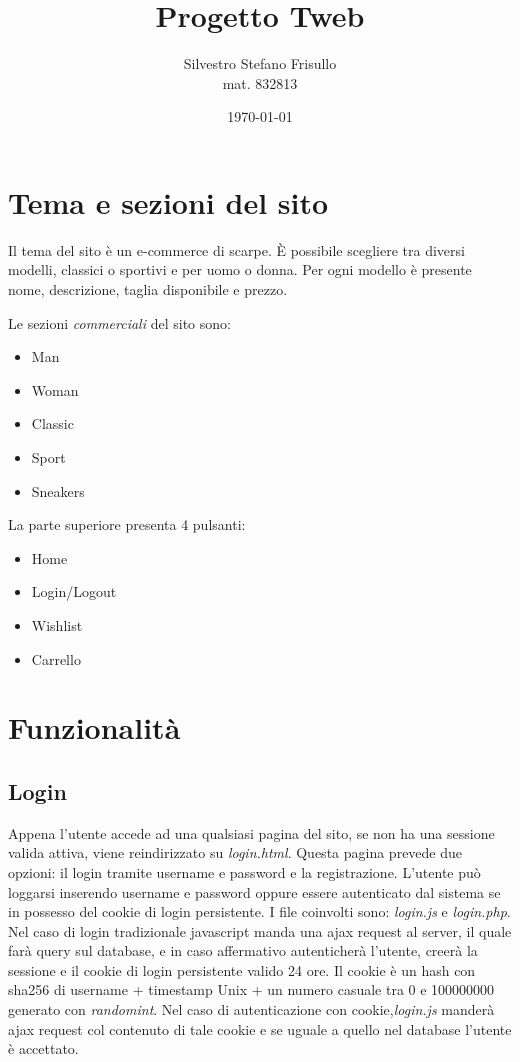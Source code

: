 \documentclass[a4paper,12pt]{article}
\begin{document}
\title{Progetto Tweb}
\author{Silvestro Stefano Frisullo \\ mat. 832813}
\date{\today}
\maketitle
{}
\tableofcontents
\newpage
{}

\section{Tema e sezioni del sito}
    Il tema del sito è un e-commerce di scarpe. 
	È possibile scegliere tra diversi modelli, classici o sportivi e per uomo o donna.
	Per ogni modello è presente nome, descrizione, taglia disponibile e prezzo.
	
	Le sezioni \textit{commerciali} del sito sono:
	\begin{itemize}
		\item Man
		\item Woman
		\item Classic 
		\item Sport 
		\item Sneakers
  	\end{itemize}
	La parte superiore presenta 4 pulsanti:
	\begin{itemize}
		\item Home
		\item Login/Logout
		\item Wishlist 
		\item Carrello 
  	\end{itemize}

\section{Funzionalità}
\subsection{Login}
Appena l'utente accede ad una qualsiasi pagina del sito, se non ha una sessione valida attiva,
viene reindirizzato su \textit{login.html}. Questa pagina prevede due opzioni: il login tramite
username e password e la registrazione. L'utente può loggarsi inserendo username e password oppure 
essere autenticato dal sistema se in possesso del cookie di login persistente.
I file coinvolti sono: \textit{login.js} e \textit{login.php}. Nel caso di login tradizionale javascript
manda una ajax request al server, il quale farà query sul database, e in caso affermativo
autenticherà l'utente, creerà la sessione e il cookie di login persistente valido 24 ore.
Il cookie è un hash con sha256 di username + timestamp Unix + un numero casuale tra 0 e 100000000
generato con \textit{random\textunderscore int}. 
Nel caso di autenticazione con cookie,\textit{login.js} manderà ajax request col contenuto di tale cookie e 
se uguale a quello nel database l'utente è accettato.
\end{document}
